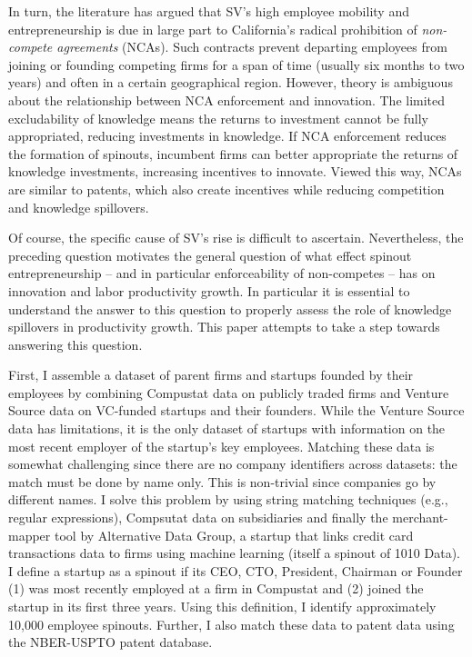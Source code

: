 \documentclass[12pt,english]{article}
\theoremstyle{remark}
\begin{document}
In turn, the literature has argued that SV's high employee mobility and entrepreneurship is due in large part to California's radical prohibition of \textit{non-compete agreements} (NCAs). Such contracts prevent departing employees from joining or founding competing firms for a span of time (usually six months to two years) and often in a certain geographical region. However, theory is ambiguous about the relationship between NCA enforcement and innovation. The limited excludability of knowledge means the returns to investment cannot be fully appropriated, reducing investments in knowledge. If NCA enforcement reduces the formation of spinouts, incumbent firms can better appropriate the returns of knowledge investments, increasing incentives to innovate. Viewed this way, NCAs are similar to patents, which also create incentives while reducing competition and knowledge spillovers.

Of course, the specific cause of SV's rise is difficult to ascertain. Nevertheless, the preceding question motivates the general question of what effect spinout entrepreneurship -- and in particular enforceability of non-competes -- has on innovation and labor productivity growth. In particular it is essential to understand the answer to this question to properly assess the role of knowledge spillovers in productivity growth. This paper attempts to take a step towards answering this question.

First, I assemble a dataset of parent firms and startups founded by their employees by combining Compustat data on publicly traded firms and Venture Source data on VC-funded startups and their founders. While the Venture Source data has limitations, it is the only dataset of startups with information on the most recent employer of the startup's key employees. Matching these data is somewhat challenging since there are no company identifiers across datasets: the match must be done by name only. This is non-trivial since companies go by different names. I solve this problem by using string matching techniques (e.g., regular expressions), Compsutat data on subsidiaries and finally the merchant-mapper tool by Alternative Data Group, a startup that links credit card transactions data to firms using machine learning (itself a spinout of 1010 Data). I define a startup as a spinout if its CEO, CTO, President, Chairman or Founder (1) was most recently employed at a firm in Compustat and (2) joined the startup in its first three years. Using this definition, I identify approximately 10,000 employee spinouts. Further, I also match these data to patent data using the NBER-USPTO patent database. 
\end{document}
